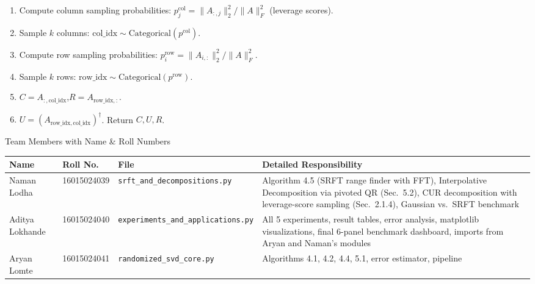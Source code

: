 \documentclass[12pt,a4paper]{article}
\makeatletter
\renewcommand{\section}{\@startsection{section}{1}{\z@}
  {-2.8ex plus -1ex minus -.2ex}{1.3ex plus .2ex}
  {\large\bfseries\color{deepblue}}}
\makeatother
\begin{document}
\begin{enumerate}[leftmargin=2em, itemsep=2pt]
  \item Compute column sampling probabilities:
    $p_j^\text{col} = \|A_{:,j}\|_2^2 / \|A\|_F^2$ (leverage scores).
  \item Sample $k$ columns: $\mathrm{col\_idx} \sim \mathrm{Categorical}(p^\text{col})$.
  \item Compute row sampling probabilities:
    $p_i^\text{row} = \|A_{i,:}\|_2^2 / \|A\|_F^2$.
  \item Sample $k$ rows: $\mathrm{row\_idx} \sim \mathrm{Categorical}(p^\text{row})$.
  \item $C = A_{:,\mathrm{col\_idx}}$,\quad $R = A_{\mathrm{row\_idx},:}$.
  \item $U = (A_{\mathrm{row\_idx},\mathrm{col\_idx}})^\dagger$. Return $C, U, R$.
\end{enumerate}

\section{Team Members with Name \& Roll Numbers}

\begin{center}
\begin{tabular}{lllp{6cm}}
\toprule
\textbf{Name} & \textbf{Roll No.} & \textbf{File} & \textbf{Detailed Responsibility} \\
\midrule
Naman Lodha & 16015024039 & \texttt{srft\_and\_decompositions.py} &
  Algorithm 4.5 (SRFT range finder with FFT), Interpolative Decomposition
  via pivoted QR (Sec.\ 5.2), CUR decomposition with leverage-score
  sampling (Sec.\ 2.1.4), Gaussian vs.\ SRFT benchmark \\[0.5em]
Aditya Lokhande & 16015024040 & \texttt{experiments\_and\_applications.py} &
  All 5 experiments, result tables, error analysis, matplotlib visualizations,
  final 6-panel benchmark dashboard, imports from Aryan and Naman's modules \\[0.5em]
Aryan Lomte & 16015024041 & \texttt{randomized\_svd\_core.py} &
  Algorithms 4.1, 4.2, 4.4, 5.1, error estimator, pipeline \\
\bottomrule
\end{tabular}
\end{center}

\end{document}
